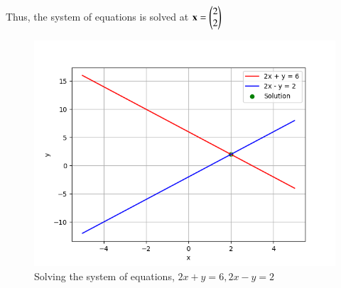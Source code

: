 \documentclass[journal]{IEEEtran}
\begin{document}
Thus, the system of equations is solved at $\mathbf{x} = \begin{pmatrix}2 \\ 2\end{pmatrix}$
\begin{figure}[h!]
   \centering
   \includegraphics[width=1\columnwidth]{figs/fig.png}
   \caption{Solving the system of equations, $2x + y = 6, 2x - y = 2$}
   \label{stemplot}
\end{figure}
\end{document}
